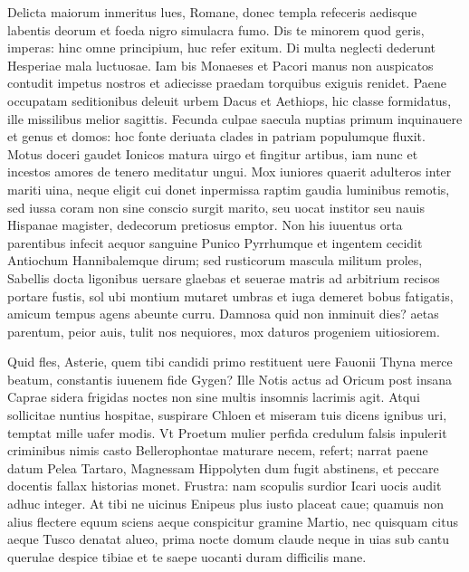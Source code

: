 \documentclass{book}
\newenvironment {carmen} [1] [\relax] 
  {\Titulus \Versus \incipit*\numerus{1}#1}
  {\endVersus}
\newcommand {\Alcaic}    {\Forma \strophae {0 \poena 01 \poena 2}}
\newcommand {\AsclB}     {\Forma \strophae {0 \poena 02 \poena 3}}
\begin{document}
\begin{carmen}[\Alcaic]


Delicta maiorum inmeritus lues,
 Romane, donec templa refeceris
      aedisque labentis deorum et
      foeda nigro simulacra fumo. 
Dis te minorem quod geris, imperas:               
 hinc omne principium, huc refer exitum.
      Di multa neglecti dederunt
      Hesperiae mala luctuosae. 
Iam bis Monaeses et Pacori manus
 non auspicatos contudit impetus               
      nostros et adiecisse praedam
      torquibus exiguis renidet. 
Paene occupatam seditionibus
 deleuit urbem Dacus et Aethiops,
      hic classe formidatus, ille               
      missilibus melior sagittis. 
Fecunda culpae saecula nuptias
 primum inquinauere et genus et domos:
      hoc fonte deriuata clades
      in patriam populumque fluxit.                
Motus doceri gaudet Ionicos
 matura uirgo et fingitur artibus,
      iam nunc et incestos amores
      de tenero meditatur ungui. 
Mox iuniores quaerit adulteros               
 inter mariti uina, neque eligit
      cui donet inpermissa raptim
      gaudia luminibus remotis, 
sed iussa coram non sine conscio
 surgit marito, seu uocat institor               
      seu nauis Hispanae magister,
      dedecorum pretiosus emptor. 
Non his iuuentus orta parentibus
 infecit aequor sanguine Punico
      Pyrrhumque et ingentem cecidit               
      Antiochum Hannibalemque dirum; 
sed rusticorum mascula militum
 proles, Sabellis docta ligonibus
      uersare glaebas et seuerae
      matris ad arbitrium recisos                
portare fustis, sol ubi montium
 mutaret umbras et iuga demeret
      bobus fatigatis, amicum
      tempus agens abeunte curru. 
Damnosa quid non inminuit dies?               
 aetas parentum, peior auis, tulit
      nos nequiores, mox daturos
      progeniem uitiosiorem. 

\end{carmen}

\begin{carmen}[\AsclB]


Quid fles, Asterie, quem tibi candidi
 primo restituent uere Fauonii
      Thyna merce beatum,
      constantis iuuenem fide 
Gygen? Ille Notis actus ad Oricum               
 post insana Caprae sidera frigidas
      noctes non sine multis
      insomnis lacrimis agit. 
Atqui sollicitae nuntius hospitae,
 suspirare Chloen et miseram tuis               
      dicens ignibus uri,
      temptat mille uafer modis. 
Vt Proetum mulier perfida credulum
 falsis inpulerit criminibus nimis
      casto Bellerophontae               
      maturare necem, refert; 
narrat paene datum Pelea Tartaro,
 Magnessam Hippolyten dum fugit abstinens,
      et peccare docentis
      fallax historias monet.                
Frustra: nam scopulis surdior Icari
 uocis audit adhuc integer. At tibi
      ne uicinus Enipeus
      plus iusto placeat caue; 
quamuis non alius flectere equum sciens               
 aeque conspicitur gramine Martio,
      nec quisquam citus aeque
      Tusco denatat alueo, 
prima nocte domum claude neque in uias
 sub cantu querulae despice tibiae               
      et te saepe uocanti
      duram difficilis mane. 

\end{carmen}
\end{document}
